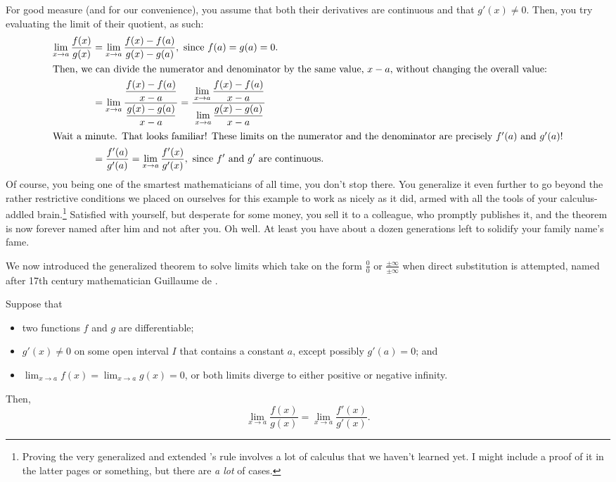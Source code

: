 For good measure (and for our convenience), you assume that both their derivatives are continuous and that \(g'(x) \neq 0\). Then, you try evaluating the limit of their quotient, as such:\begin{align*}
    \lim_{x\to a} \frac{f(x)}{g(x)} &= \lim_{x\to a} \frac{f(x) - f(a)}{g(x) - g(a)},~\text{since \(f(a) = g(a) = 0\).}\\
    \intertext{Then, we can divide the numerator and denominator by the same value, \(x - a\), without changing the overall value:} 
    &= \lim_{x \to a} \frac{\dfrac{f(x) - f(a)}{x-a}}{\dfrac{g(x) - g(a)}{x - a}} = \frac{\displaystyle{} \lim_{x\to a} \frac{f(x) - f(a)}{x-a}}{\displaystyle{} \lim_{x\to a} \frac{g(x) - g(a)}{x-a}}\\ 
    \intertext{Wait a minute. That looks familiar! These limits on the numerator and the denominator are precisely \(f'(a)\) and \(g'(a)\)!}
    &= \frac{f'(a)}{g'(a)} = \lim_{x \to a} \frac{f'(x)}{g'(x)},~\text{since \(f'\) and \(g'\) are continuous.} 
\end{align*}
Of course, you being one of the smartest mathematicians of all time, you don't stop there. You generalize it even further to go beyond the rather restrictive conditions 
we placed on ourselves for this example to work as nicely as it did, armed with all the tools of your calculus-addled brain.\footnote{Proving the very generalized and 
extended \lh's rule involves a lot of calculus that we haven't learned yet. I might include a proof of it in the latter pages or something, but there are \textit{a lot} of cases.} 
Satisfied with yourself, but desperate for some money, you sell it to a colleague, who promptly publishes it, and the theorem is now forever named after him and not after you. 
Oh well. At least you have about a dozen generations left to solidify your family name's fame.\par 
We now introduced the generalized theorem to solve limits which take on the form \(\frac{0}{0}\) or \(\frac{\pm \infty}{\pm \infty}\) when direct substitution is attempted, named after
17th century mathematician Guillaume de \lh.
\begin{theo}[\lh's rule]
Suppose that\begin{itemize}
    \item two functions \(f\) and \(g\) are differentiable;
    \item \(g'(x) \neq 0 \) on some open interval \(I\) that contains a constant \(a\), except
possibly \(g'(a) = 0\); and 
    \item \(\lim_{x\to a} f(x) = \lim_{x\to a} g(x) = 0\), or both limits diverge to either positive or negative infinity.
\end{itemize} Then,\[
    \lim_{x\to a} \frac{f(x)}{g(x)} = \lim_{x\to a} \frac{f'(x)}{g'(x)}.
\]
\end{theo}
